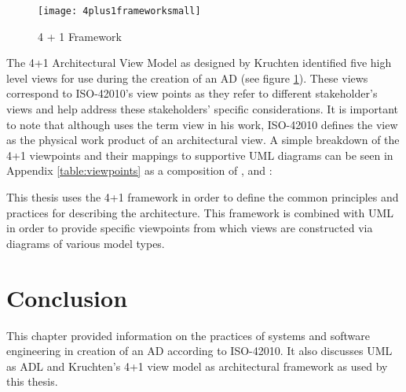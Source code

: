 \begin{figure}
\centering
\texttt{[image: 4plus1frameworksmall]}
\caption{4 + 1 Framework}
\label{fig:4plus1frameworksmall}
\end{figure}

The 4+1 Architectural View Model as designed by Kruchten \cite{Kruchten} identified five high level views for use during the creation of an AD (see figure \ref{fig:4plus1frameworksmall}). These views correspond to ISO-42010's view points as they refer to different stakeholder's views and help address these stakeholders' specific considerations. It is important to note that although \cite{Kruchten} uses the term view in his work, ISO-42010 defines the view as the physical work product of an architectural view. A simple breakdown of the 4+1 viewpoints and their mappings to supportive UML diagrams can be seen in Appendix \ref{table:viewpoints} as a composition of \cite{Wiki4plus1}, \cite{Muchandi2007} and \cite{Kruchten}:


This thesis uses the 4+1 framework in order to define the common principles and practices for describing the architecture. This framework is combined with UML in order to provide specific viewpoints from which views are constructed via diagrams of various model types.

\section{Conclusion}

This chapter provided information on the practices of systems and software engineering in creation of an AD according to ISO-42010. It also discusses UML as ADL and Kruchten's 4+1 view model as architectural framework as used by this thesis.


